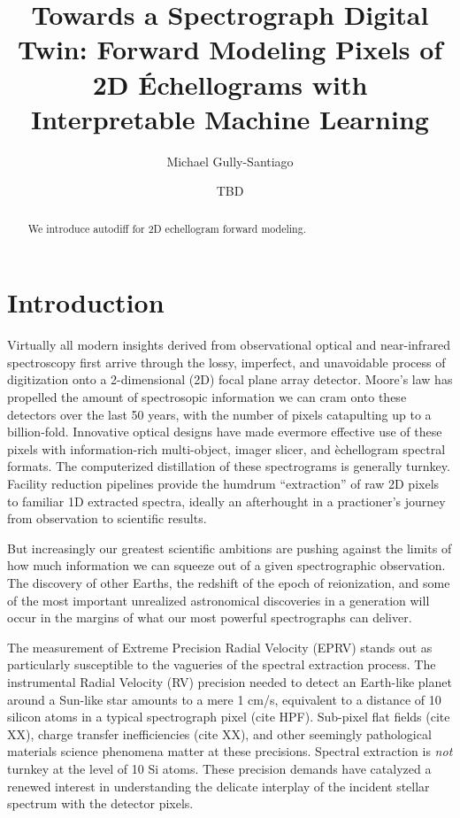 \documentclass[twocolumn]{aastex63}
\begin{document}
\title{Towards a Spectrograph Digital Twin: Forward Modeling Pixels of 2D \'Echellograms with Interpretable Machine Learning}

\author{Michael Gully-Santiago}

\author{TBD}


\begin{abstract}

  We introduce autodiff for 2D echellogram forward modeling.

\end{abstract}



\section{Introduction}\label{sec:intro}

Virtually all modern insights derived from observational optical and near-infrared spectroscopy first arrive through the lossy, imperfect, and unavoidable process of digitization onto a 2-dimensional (2D) focal plane array detector.  Moore's law has propelled the amount of spectrosopic information we can cram onto these detectors over the last 50 years, with the number of pixels catapulting up to a billion-fold.  Innovative optical designs have made evermore effective use of these pixels with information-rich multi-object, imager slicer, and \`echellogram spectral formats.  The computerized distillation of these spectrograms is generally turnkey.  Facility reduction pipelines provide the humdrum ``extraction'' of raw 2D pixels to familiar 1D extracted spectra, ideally an afterhought in a practioner's journey from observation to scientific results.

But increasingly our greatest scientific ambitions are pushing against the limits of how much information we can squeeze out of a given spectrographic observation.  The discovery of other Earths, the redshift of the epoch of reionization, and some of the most important unrealized astronomical discoveries in a generation will occur in the margins of what our most powerful spectrographs can deliver.

The measurement of Extreme Precision Radial Velocity (EPRV) stands out as particularly susceptible to the vagueries of the spectral extraction process.  The instrumental Radial Velocity (RV) precision needed to detect an Earth-like planet around a Sun-like star amounts to a mere 1 cm/s, equivalent to a distance of 10 silicon atoms in a typical spectrograph pixel (cite HPF).  Sub-pixel flat fields (cite XX), charge transfer inefficiencies (cite XX), and other seemingly pathological materials science phenomena matter at these precisions.  Spectral extraction is \emph{not} turnkey at the level of 10 Si atoms.  These precision demands have catalyzed a renewed interest in understanding the delicate interplay of the incident stellar spectrum with the detector pixels.
\end{document}
